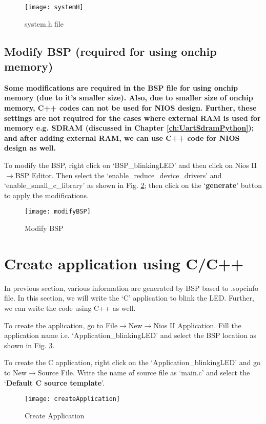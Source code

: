 	\begin{figure}[!h]
		\centering
		\texttt{[image: systemH]}
		\caption{system.h file}
		\label{fig:systemH}
	\end{figure}

\subsection{Modify BSP (required for using onchip memory)} \label{sec:ModifyBSP}
\textbf{Some modifications are required in the BSP file for using onchip memory (due to it's smaller size). Also, due to smaller size of onchip memory, C++ codes can not be used for NIOS design. Further, these settings are not required for the cases where external RAM is used for memory e.g. SDRAM (discussed in Chapter \ref{ch:UartSdramPython}); and after adding external RAM, we can use C++ code for NIOS design as well.} 

To modify the BSP, right click on `BSP\_blinkingLED' and then click on Nios II$\rightarrow$BSP Editor. Then select the `enable\_reduce\_device\_drivers' and `enable\_small\_c\_library' as shown in Fig. \ref{fig:modifyBSP}; then click on the `\textbf{generate}' button to apply the modifications. 
	\begin{figure}[!h]
		\centering
		\texttt{[image: modifyBSP]}
		\caption{Modify BSP}
		\label{fig:modifyBSP}
	\end{figure}


\section{Create application using C/C++}\label{sec:AddApplication}
In previous section, various information are generated by BSP based to .sopcinfo file. In this section, we will write the `C' application to blink the LED. Further, we can write the code using C++ as well. 

To create the application, go to File$\rightarrow$New$\rightarrow$Nios II Application. Fill the application name i.e. `Application\_blinkingLED' and select the BSP location as shown in Fig. \ref{fig:createApplication}. 

To create the C application, right click on the `Application\_blinkingLED' and go to New$\rightarrow$Source File. Write the name of source file as `main.c' and select the `\textbf{Default C source template}'.

	\begin{figure}[!h]
		\centering
		\texttt{[image: createApplication]}
		\caption{Create Application}
		\label{fig:createApplication}
	\end{figure}

